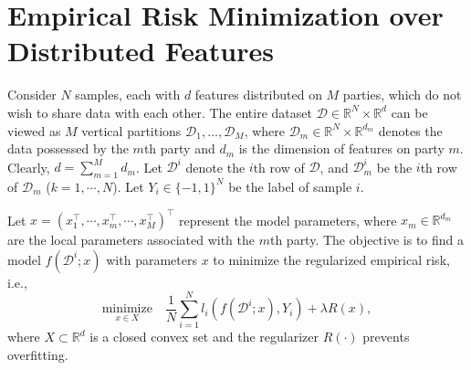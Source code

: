 \section{Empirical Risk Minimization over Distributed Features}
\label{sec:problem}

Consider $N$ samples, each with $d$ features distributed on $M$ parties, which do not wish to share data with each other.
The entire dataset $\mathcal D\in \mathbb{R}^N\times\mathbb{R}^{d}$ can be viewed as $M$ vertical partitions $\mathcal D_1,\ldots,\mathcal D_M$, where
$\mathcal{D}_m\in\mathbb{R}^N\times\mathbb{R}^{d_m}$ denotes the data possessed by the $m$th party and $d_m$ is the dimension of features on party $m$. Clearly, $d=\sum_{m=1}^{M}d_m$. Let $\mathcal{D}^i$ denote the $i$th row of $\mathcal{D}$, and
$\mathcal{D}_m^i$ be the $i$th row of $\mathcal{D}_m$ ($k=1,\cdots,N$). 
Let $Y_i\in\{-1, 1\}^N$ be the label of sample $i$. %

Let $x=(x_1^\top,\cdots,x_m^\top,\cdots,x_M^\top)^\top$ represent the model parameters, where $x_m\in\mathbb{R}^{d_m}$ are the local parameters associated with the $m$th party. The objective is to find a model $f(\mathcal{D}^i; x)$ with parameters $x$ %
to minimize the regularized empirical risk, i.e.,
\[
\underset{x \in X}{\text{minimize}} \quad\frac{1}{N}\sum_{i=1}^{N} l_i(f(\mathcal{D}^i; x), Y_i) + \lambda R(x),
\]
where $X\subset\mathbb{R}^d$ is a closed convex set and the regularizer $R(\cdot)$ prevents overfitting.


